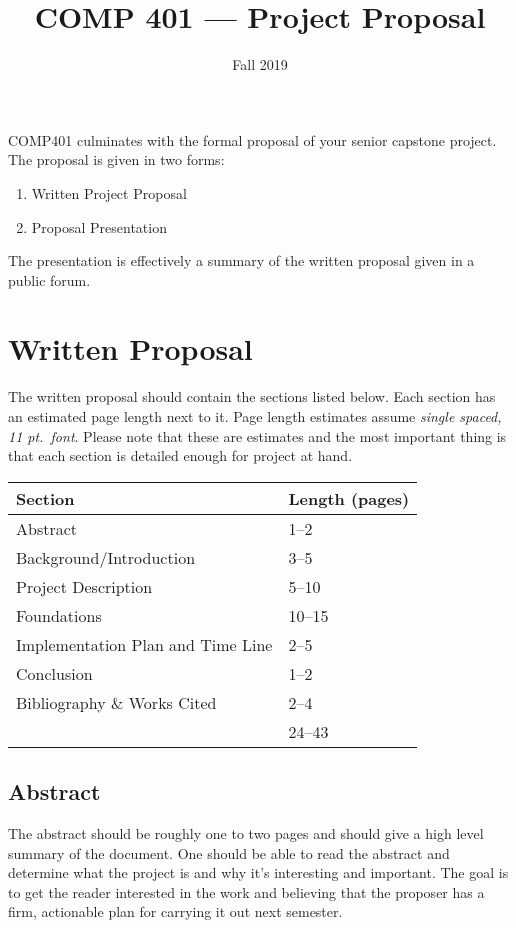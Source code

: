 \documentclass[nobib]{tufte-handout}
\title{COMP 401 --- Project Proposal}
\author{  }
\date{Fall 2019}
\begin{document}
\maketitle

COMP401 culminates with the formal proposal of your senior capstone project.  The proposal is given in two forms:
\begin{enumerate}
\item Written Project Proposal
\item Proposal Presentation
\end{enumerate}
The presentation is effectively a summary of the written proposal given in a public forum.

\section{Written Proposal}

The written proposal should contain the sections listed below.  Each section has an estimated page length next to it.  Page length estimates assume \textit{single spaced, 11 pt.\ font}.  Please note that these are estimates and the most important thing is that each section is detailed enough for project at hand.
\begin{center}
\begin{tabular}{ll}
  Section & Length (pages) \\ \toprule
  Abstract & 1--2 \\
  Background/Introduction  & 3--5 \\
  Project Description  & 5--10 \\
  Foundations & 10--15 \\
  Implementation Plan and Time Line & 2--5 \\
  Conclusion & 1--2 \\
  Bibliography \& Works Cited & 2--4 \\ \midrule
   & 24--43
\end{tabular}
\end{center}

\subsection{Abstract}

The abstract should be roughly one to two pages and should give a high level summary of the document.  One should be able to read the abstract and determine what the project is and why it's interesting and important.  The goal is to get the reader interested in the work and believing that the proposer has a firm, actionable plan for carrying it out next semester.
\end{document}

